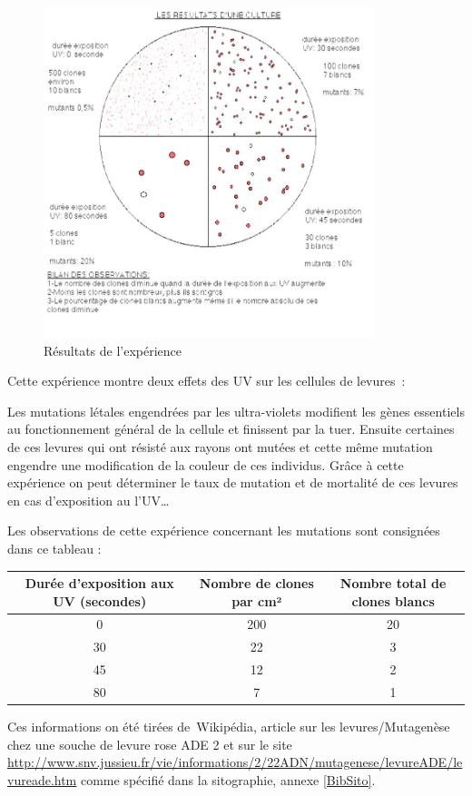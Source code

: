 \begin{figure}[H]
	\centering
	\includegraphics[width=26em]{Annexes/Images/lev.jpg}
	\caption{Résultats de l'expérience}
\end{figure}

Cette expérience montre deux effets des UV sur les cellules de levures :

Les mutations létales engendrées par les ultra-violets modifient les gènes essentiels au fonctionnement général de la cellule et finissent par la tuer. Ensuite certaines de ces levures qui ont résisté aux rayons ont mutées et cette même mutation engendre une modification de la couleur de ces individus. Grâce à cette expérience on peut déterminer le taux de mutation et de mortalité de ces levures en cas d’exposition au l’UV…

Les observations de cette expérience concernant les mutations sont consignées dans ce tableau : 

\begin{center}
	\begin{tabular}{ c | c | c  }
	   Durée d’exposition aux UV (secondes) & Nombre de clones par cm² & Nombre total de clones blancs \\ \hline \hline
	   0 & 200 & 20 \\ \hline
	   30 & 22 & 3 \\ \hline
	   45 & 12 & 2 \\ \hline
	   80 & 7 & 1
	\end{tabular}
\end{center}


Ces informations on été tirées de Wikipédia, article sur les levures/Mutagenèse chez une souche de levure rose ADE 2 et sur le site \url{http://www.snv.jussieu.fr/vie/informations/2/22ADN/mutagenese/levureADE/levureade.htm} comme spécifié dans la sitographie, annexe \ref{BibSito}.
